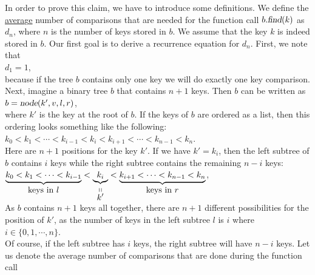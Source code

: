 
In order to prove this claim, we have to introduce some definitions.
We define the \underline{avera}g\underline{e} number of comparisons that are needed for the function
call $b.\textsl{find}(k)$ as  $d_n$, where $n$ is the number of keys stored in $b$.  We assume that
the key $k$ is indeed stored in $b$.  Our first goal is to derive a recurrence equation for 
$d_n$.  First, we note that  
\\[0.2cm]
\hspace*{1.3cm} $d_1 = 1$,
\\[0.2cm]
because if the tree $b$ contains only one key we will do exactly one key comparison.
Next, imagine a binary tree $b$ that contains $n+1$ keys.  Then $b$
can be written as 
\\[0.2cm]
\hspace*{1.3cm}
$b = \textsl{node}(k',v,l,r)$,
\\[0.2cm]
where $k'$ is the key at the root of $b$.  If the keys of $b$ are ordered as a list, then this
ordering looks something like the following:
\\[0.2cm]
\hspace*{1.3cm}
$k_0 < k_1 < \cdots < k_{i-1} < k_{i} < k_{i+1} < \cdots < k_{n-1} < k_n$.
\\[0.2cm]
Here are $n+1$ positions for the key $k'$.
If we have $k' = k_i$, then the left subtree of $b$ contains  $i$ keys while the right subtree
contains the remaining  $n-i$ keys:
\\[0.2cm]
\hspace*{1.3cm}
$\underbrace{k_0 < k_1 < \cdots < k_{i-1}}_{\mbox{keys in $l$}} < 
 \underbrace{k_{i}}_{\stackrel{\displaystyle \shortparallel}{\displaystyle k'}} < 
 \underbrace{k_{i+1} < \cdots < k_{n-1} < k_n}_{\mbox{keys in $r$}}$,
\\[0.2cm]
As  $b$ contains $n+1$ keys all together, there are  $n+1$ different possibilities for the position
of $k'$, as the number of keys in the left subtree $l$ is $i$ where
\\[0.2cm]
\hspace*{1.3cm}
 $i \in \{0,1, \cdots, n\}$.
\\[0.2cm]
Of course, if the left subtree has $i$ keys, the right subtree will have $n-i$ keys.
Let us denote the average number of comparisons that are done during the function call
